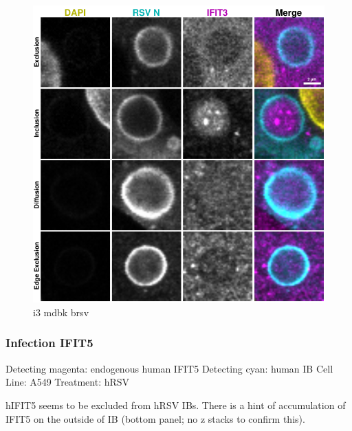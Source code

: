 \begin{figure}
    \centering
    \includegraphics[width=1\linewidth]{09. Chapter 4/Figs/02. Infection/02. IFIT3/09. mdbk i3.pdf}
    \caption[i3 mdbk brsv]{i3 mdbk brsv}
    \label{fig:i3 mdbk brsv}
\end{figure}

\subsubsection{Infection IFIT5}
Detecting magenta: endogenous human IFIT5 \newline
Detecting cyan: human IB \newline
Cell Line: A549 \newline
Treatment: hRSV \newline

hIFIT5 seems to be excluded from hRSV IBs. There is a hint of accumulation of IFIT5 on the outside of IB (bottom panel; no z stacks to confirm this). 

